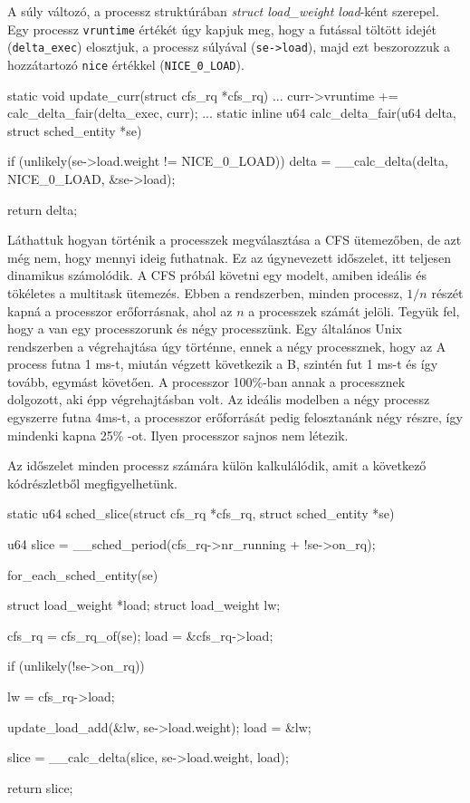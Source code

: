 A súly változó, a processz struktúrában \textit{struct load\_weight load}-ként szerepel.
Egy processz \texttt{vruntime} értékét úgy kapjuk meg, hogy a futással töltött idejét (\texttt{delta\_exec}) elosztjuk, a processz súlyával (\texttt{se->load}), majd ezt beszorozzuk a hozzátartozó \texttt{nice} értékkel (\texttt{NICE\_0\_LOAD}).
\begin{cpp} 
static void update_curr(struct cfs_rq *cfs_rq)
{
    ...
    curr->vruntime += calc_delta_fair(delta_exec, curr);
    ...
}
static inline u64 calc_delta_fair(u64 delta, struct sched_entity *se)
{
    if (unlikely(se->load.weight != NICE_0_LOAD))
        delta = __calc_delta(delta, NICE_0_LOAD, &se->load);

    return delta;
}
\end{cpp}

Láthattuk hogyan történik a processzek megválasztása a CFS ütemezőben, de azt még nem, hogy mennyi ideig futhatnak.
Ez az úgynevezett időszelet, itt teljesen dinamikus számolódik.
A CFS próbál követni egy modelt, amiben ideális és tökéletes a multitask ütemezés. Ebben a rendszerben, minden processz, $1/n$ részét kapná a processzor erőforrásnak, ahol az $n$ a processzek számát jelöli. 
Tegyük fel, hogy a van egy processzorunk és négy processzünk.
Egy általános Unix rendszerben a végrehajtása úgy történne, ennek a négy processznek, hogy az A process futna 1 ms-t, miután végzett következik a B, szintén fut 1 ms-t és így tovább, egymást követően. A processzor 100\%-ban annak a processznek dolgozott, aki épp végrehajtásban volt.
Az ideális modelben a négy processz egyszerre futna 4ms-t, a processzor erőforrását pedig felosztanánk négy részre, így mindenki kapna 25\% -ot. Ilyen processzor sajnos nem létezik.

Az időszelet minden processz számára külön kalkulálódik, amit a következő kódrészletből megfigyelhetünk.

\begin{cpp}
static u64 sched_slice(struct cfs_rq *cfs_rq, struct sched_entity *se)
{
    u64 slice = __sched_period(cfs_rq->nr_running + !se->on_rq);

    for_each_sched_entity(se) {
        struct load_weight *load;
        struct load_weight lw;

        cfs_rq = cfs_rq_of(se);
        load = &cfs_rq->load;

        if (unlikely(!se->on_rq)) {
            lw = cfs_rq->load;

            update_load_add(&lw, se->load.weight);
            load = &lw;
        }
        slice = __calc_delta(slice, se->load.weight, load);
    }
    return slice;
}
\end{cpp}

